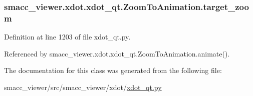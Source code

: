 \subsubsection[{\texorpdfstring{target\+\_\+zoom}{target_zoom}}]{\setlength{\rightskip}{0pt plus 5cm}smacc\+\_\+viewer.\+xdot.\+xdot\+\_\+qt.\+Zoom\+To\+Animation.\+target\+\_\+zoom}\hypertarget{classsmacc__viewer_1_1xdot_1_1xdot__qt_1_1ZoomToAnimation_ade4c136c38f4c369d08f7f501482bdc1}{}\label{classsmacc__viewer_1_1xdot_1_1xdot__qt_1_1ZoomToAnimation_ade4c136c38f4c369d08f7f501482bdc1}


Definition at line 1203 of file xdot\+\_\+qt.\+py.



Referenced by smacc\+\_\+viewer.\+xdot.\+xdot\+\_\+qt.\+Zoom\+To\+Animation.\+animate().



The documentation for this class was generated from the following file\+:\begin{DoxyCompactItemize}
\item 
smacc\+\_\+viewer/src/smacc\+\_\+viewer/xdot/\hyperlink{xdot__qt_8py}{xdot\+\_\+qt.\+py}\end{DoxyCompactItemize}
